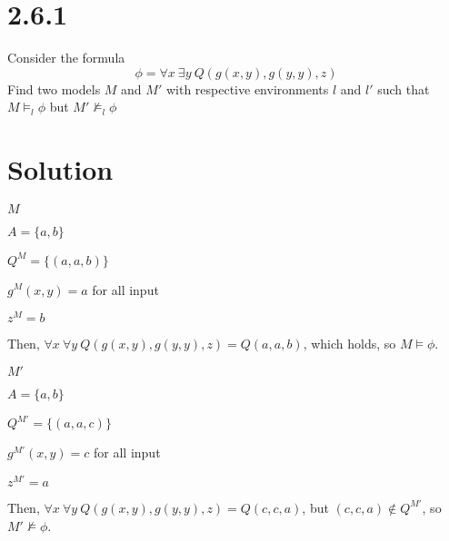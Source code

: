 \documentclass[10pt]{article}
\begin{document}
\begin{description*}
\begin{prooftree}


\end{prooftree}

\end{description*}

\section*{2.6.1}
Consider the formula
\[
\phi = \forall x\ \exists y\ Q(g(x,y),g(y,y),z)
\]
Find two models $M$ and $M'$ with respective environments $l$ and $l'$ such that $M \models_{l} \phi$ but $M' \not \models_{l} \phi$
\section*{Solution}
\begin{description*}
\item $M$
\item $A = \{a,b\}$
\item $Q^{M} = \{(a,a,b)\}$
\item $g^{M}(x,y) = a$ for all input
\item $z^{M} = b$
\end{description*}
Then, $\forall x\ \forall y\ Q(g(x,y),g(y,y),z)=Q(a,a,b)$, which holds, so $M \models \phi$.
\begin{description*}
\item $M'$
\item $A = \{a,b\}$
\item $Q^{M'} = \{(a,a,c)\}$
\item $g^{M'}(x,y) = c$ for all input
\item $z^{M'} = a$
\end{description*}
Then, $\forall x\ \forall y\ Q(g(x,y),g(y,y),z) = Q(c,c,a)$, but $(c,c,a) \not \in Q^{M'}$, so $M' \not \models \phi$.
\end{document}
